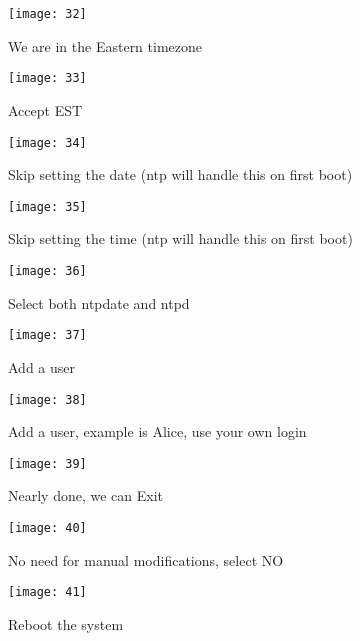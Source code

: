 \begin{figure}
  \centering
\texttt{[image: 32]}
  \caption{We are in the Eastern timezone}
  \label{fig:utm-fbsd-eastern}
\end{figure}

\begin{figure}
  \centering
\texttt{[image: 33]}
  \caption{Accept EST}
  \label{fig:utm-fbsd-est}
\end{figure}

\begin{figure}
  \centering
\texttt{[image: 34]}
  \caption{Skip setting the date (ntp will handle this on first boot)}
  \label{fig:utm-fbsd-date}
\end{figure}

\begin{figure}
  \centering
\texttt{[image: 35]}
  \caption{Skip setting the time (ntp will handle this on first boot)}
  \label{fig:utm-fbsd-time}
\end{figure}

\begin{figure}
  \centering
\texttt{[image: 36]}
  \caption{Select both ntpdate and ntpd}
  \label{fig:utm-fbsd-ntp}
\end{figure}

\begin{figure}
  \centering
\texttt{[image: 37]}
  \caption{Add a user}
  \label{fig:utm-fbsd-adduser}
\end{figure}

\begin{figure}
  \centering
\texttt{[image: 38]}
  \caption{Add a user, example is Alice, use your own login}
  \label{fig:utm-fbsd-alice}
\end{figure}

\begin{figure}
  \centering
\texttt{[image: 39]}
  \caption{Nearly done, we can Exit}
  \label{fig:utm-fbsd-exit}
\end{figure}

\begin{figure}
  \centering
\texttt{[image: 40]}
  \caption{No need for manual modifications, select NO}
  \label{fig:utm-fbsd-nomods}
\end{figure}

\begin{figure}
  \centering
\texttt{[image: 41]}
  \caption{Reboot the system}
  \label{fig:utm-fbsd-reboot}
\end{figure}

